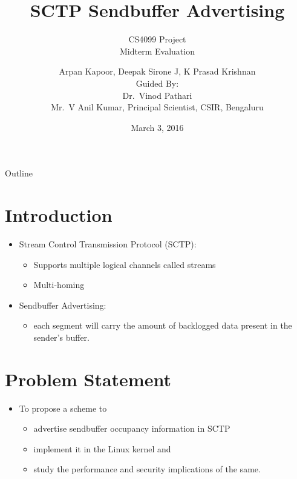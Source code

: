 \documentclass{beamer}
\title{SCTP Sendbuffer Advertising}
\subtitle{CS4099 Project\\
  Midterm Evaluation}
\author{Arpan Kapoor, Deepak Sirone J, K Prasad Krishnan\\
	Guided By:\\ Dr.~Vinod Pathari\\
	Mr.~V Anil Kumar, Principal Scientist, CSIR, Bengaluru}
\date{March 3, 2016}
\begin{document}
\begin{frame}
	\titlepage
\end{frame}

\begin{frame}{Outline}
	\tableofcontents
\end{frame}

\section{Introduction}
\begin{frame}{\insertsection}

\begin{itemize}
	\item Stream Control Transmission Protocol (SCTP):
	\begin{itemize}
		\item Supports multiple logical channels called streams
		\item Multi-homing
	\end{itemize}
\end{itemize}

\begin{itemize}
	\item Sendbuffer Advertising:
	\begin{itemize}
		\item each segment will carry the amount of backlogged data
			present in the sender's buffer.
	\end{itemize}
\end{itemize}

\end{frame}

\section{Problem Statement}
\begin{frame}{\insertsection}
\begin{itemize}
\item To propose a scheme to
\begin{itemize}
\item advertise sendbuffer occupancy information in SCTP
\item implement it in the Linux kernel and
\item study the performance and security implications of the same.
\end{itemize}
\end{itemize}
\end{frame}
\end{document}
